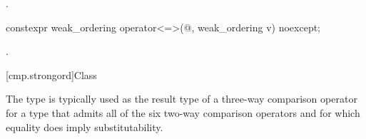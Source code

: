 \begin{itemdescr}
\pnum
\returns
{}.
\end{itemdescr}

%
\begin{itemdecl}
constexpr weak_ordering operator<=>(@\unspec@, weak_ordering v) noexcept;
\end{itemdecl}

\begin{itemdescr}
\pnum
\returns
{}.
\end{itemdescr}

[cmp.strongord]{Class }

\pnum
The  type is typically used
as the result type of a three-way comparison operator
for a type that admits
all of the six two-way comparison operators
and for which equality does imply substitutability.

